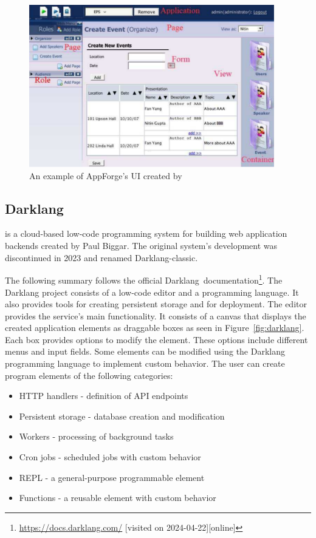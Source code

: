 \begin{figure}[htbp]
	\begin{center}
		\includegraphics[width=0.95\textwidth]{img/appforge.pdf}
	\end{center}
	\caption{An example of AppForge's UI created by \citet{Yang_Gupta_Botev_Churchill_Levchenko_Shanmugasundaram_2008} }
	\label{fig:appforge}
\end{figure}


\subsection{Darklang}
\label{sec:darklang}
\citet{darklang} is a cloud-based low-code programming system for building web application backends created by Paul Biggar.
The original system's development was discontinued in 2023 and renamed Darklang-classic.

The following summary follows the official Darklang~documentation\footnote{\url{https://docs.darklang.com/} [visited on 2024-04-22][online]}.
The Darklang project consists of a low-code editor and a programming language. It also provides tools for creating persistent storage and for deployment.
The editor provides the service's main functionality. It consists of a canvas that displays the created application elements as draggable boxes as seen in Figure~\ref{fig:darklang}.
Each box provides options to modify the element. These options include different menus and input fields.
Some elements can be modified using the Darklang programming language to implement custom behavior.
The user can create program elements of the following categories:
\begin{itemize}
	\item HTTP handlers - definition of API endpoints
	\item Persistent storage - database creation and modification
	\item Workers - processing of background tasks
	\item Cron jobs - scheduled jobs with custom behavior
	\item REPL - a general-purpose programmable element
	\item Functions - a reusable element with custom behavior
\end{itemize}

